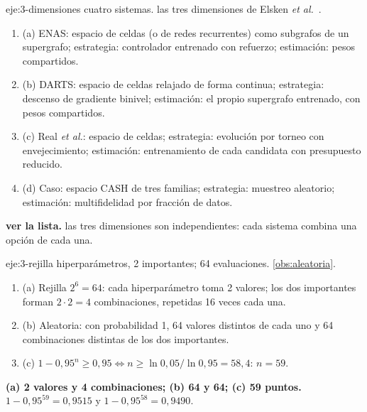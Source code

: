 \begin{solucion}{eje:3-dimensiones}
\datos cuatro sistemas.
\planteamiento las tres dimensiones de Elsken \emph{et al.}~\cite{elsken}.
\pasos
\begin{enumerate}[label=\arabic*.]
  \item (a) ENAS: espacio de celdas (o de redes recurrentes) como subgrafos de un supergrafo; estrategia: controlador entrenado con refuerzo; estimación: pesos compartidos.
  \item (b) DARTS: espacio de celdas relajado de forma continua; estrategia: descenso de gradiente binivel; estimación: el propio supergrafo entrenado, con pesos compartidos.
  \item (c) Real \emph{et al.}: espacio de celdas; estrategia: evolución por torneo con envejecimiento; estimación: entrenamiento de cada candidata con presupuesto reducido.
  \item (d) Caso: espacio CASH de tres familias; estrategia: muestreo aleatorio; estimación: multifidelidad por fracción de datos.
\end{enumerate}
\resultado \textbf{ver la lista.}
\comprobacion las tres dimensiones son independientes: cada sistema combina una opción de cada una.
\end{solucion}

\begin{solucion}{eje:3-rejilla}
 hiperparámetros, 2 importantes; 64 evaluaciones.
\planteamiento \cref{obs:aleatoria}.
\pasos
\begin{enumerate}[label=\arabic*.]
  \item (a) Rejilla $2^{6}=64$: cada hiperparámetro toma 2 valores; los dos importantes forman $2\cdot2=4$ combinaciones, repetidas 16 veces cada una.
  \item (b) Aleatoria: con probabilidad 1, 64 valores distintos de cada uno y 64 combinaciones distintas de los dos importantes.
  \item (c) $1-0{,}95^{n}\ge0{,}95\iff n\ge\ln0{,}05/\ln0{,}95=58{,}4$: $n=59$.
\end{enumerate}
\resultado \textbf{(a) 2 valores y 4 combinaciones; (b) 64 y 64; (c) 59 puntos.}
\comprobacion $1-0{,}95^{59}=0{,}9515$ y $1-0{,}95^{58}=0{,}9490$.
\end{solucion}

